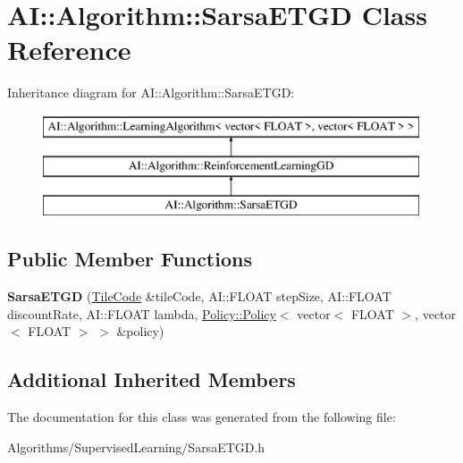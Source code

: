 \hypertarget{classAI_1_1Algorithm_1_1SarsaETGD}{\section{A\-I\-:\-:Algorithm\-:\-:Sarsa\-E\-T\-G\-D Class Reference}
\label{classAI_1_1Algorithm_1_1SarsaETGD}
}
Inheritance diagram for A\-I\-:\-:Algorithm\-:\-:Sarsa\-E\-T\-G\-D\-:\begin{figure}[H]
\begin{center}
\leavevmode
\includegraphics[height=3.000000cm]{classAI_1_1Algorithm_1_1SarsaETGD}
\end{center}
\end{figure}
\subsection*{Public Member Functions}
\begin{DoxyCompactItemize}
\item 
\hypertarget{classAI_1_1Algorithm_1_1SarsaETGD_a51da05d1ec0823c06770eaf4dc3ccdee}{{\bfseries Sarsa\-E\-T\-G\-D} (\hyperlink{classAI_1_1Algorithm_1_1TileCode}{Tile\-Code} \&tile\-Code, A\-I\-::\-F\-L\-O\-A\-T step\-Size, A\-I\-::\-F\-L\-O\-A\-T discount\-Rate, A\-I\-::\-F\-L\-O\-A\-T lambda, \hyperlink{classAI_1_1Algorithm_1_1Policy_1_1Policy}{Policy\-::\-Policy}$<$ vector$<$ F\-L\-O\-A\-T $>$, vector$<$ F\-L\-O\-A\-T $>$ $>$ \&policy)}\label{classAI_1_1Algorithm_1_1SarsaETGD_a51da05d1ec0823c06770eaf4dc3ccdee}

\end{DoxyCompactItemize}
\subsection*{Additional Inherited Members}


The documentation for this class was generated from the following file\-:\begin{DoxyCompactItemize}
\item 
Algorithms/\-Supervised\-Learning/Sarsa\-E\-T\-G\-D.\-h\end{DoxyCompactItemize}
